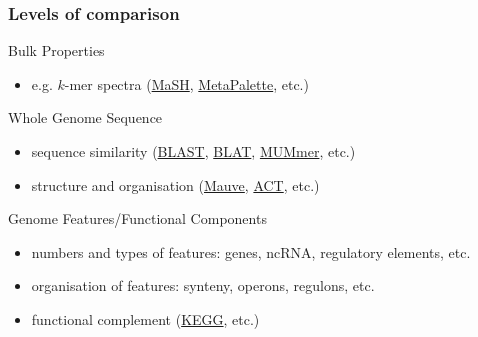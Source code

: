 \begin{frame}
  \frametitle{Levels of comparison}
    \begin{alertblock}{Bulk Properties}
      \begin{itemize}
        \item \textcolor{hutton_green}{e.g. $k$-mer spectra} (\textcolor{hutton_purple}{\href{https://github.com/marbl/Mash}{MaSH}}, \textcolor{hutton_purple}{\href{https://github.com/dkoslicki/MetaPalette}{MetaPalette}}, etc.)
      \end{itemize}
    \end{alertblock}
    \begin{block}{Whole Genome Sequence}
      \begin{itemize}
        \item \textcolor{hutton_blue}{sequence similarity} (\textcolor{hutton_purple}{\href{https://blast.ncbi.nlm.nih.gov/Blast.cgi?PAGE_TYPE=BlastDocs&DOC_TYPE=Download}{BLAST}}, \textcolor{hutton_purple}{\href{https://genome.ucsc.edu/FAQ/FAQblat.html}{BLAT}}, \textcolor{hutton_purple}{\href{http://mummer.sourceforge.net/}{MUMmer}}, etc.)
        \item \textcolor{hutton_blue}{structure and organisation} (\textcolor{hutton_purple}{\href{http://darlinglab.org/mauve/mauve.html}{Mauve}}, \textcolor{hutton_purple}{\href{http://www.sanger.ac.uk/science/tools/artemis-comparison-tool-act}{ACT}}, etc.)
      \end{itemize}
    \end{block}
    \begin{alertblock}{Genome Features/Functional Components}
      \begin{itemize}
        \item \textcolor{RawSienna}{numbers and types of features: genes, ncRNA, regulatory elements, etc.}
        \item \textcolor{RawSienna}{organisation of features: synteny, operons, regulons, etc.}
        \item \textcolor{RawSienna}{functional complement} (\textcolor{hutton_purple}{\href{http://www.genome.jp/kegg/}{KEGG}}, etc.)
      \end{itemize}
    \end{alertblock}
\end{frame}
